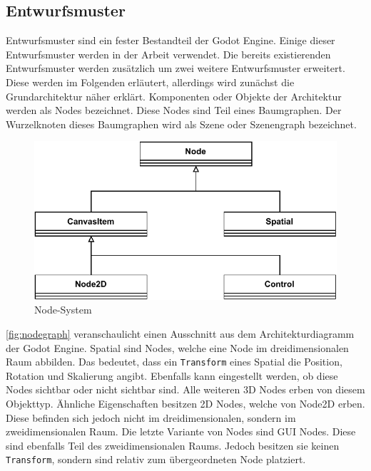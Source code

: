 \subsection{Entwurfsmuster}
Entwurfsmuster sind ein fester Bestandteil der Godot Engine.
Einige dieser Entwurfsmuster werden in der Arbeit verwendet.
Die bereits existierenden Entwurfsmuster werden zusätzlich um zwei weitere Entwurfsmuster erweitert.
Diese werden im Folgenden erläutert, allerdings wird zunächst die Grundarchitektur näher erklärt.
Komponenten oder Objekte der Architektur werden als Nodes bezeichnet.
Diese Nodes sind Teil eines Baumgraphen.
Der Wurzelknoten dieses Baumgraphen wird als Szene oder Szenengraph bezeichnet.\\

\begin{figure}[ht]
	\centering
	\includegraphics[width=0.8\columnwidth]{figures/node-graph.pdf}
	\caption{\label{fig:nodegraph} Node-System}
\end{figure}

\autoref{fig:nodegraph} veranschaulicht einen Ausschnitt aus dem Architekturdiagramm der Godot Engine\cite{godot-architecture}.
Spatial sind Nodes, welche eine Node im dreidimensionalen Raum abbilden.
Das bedeutet, dass ein \texttt{Transform} eines Spatial die Position, Rotation und Skalierung angibt.
Ebenfalls kann eingestellt werden, ob diese Nodes sichtbar oder nicht sichtbar sind.
Alle weiteren 3D Nodes erben von diesem Objekttyp.
Ähnliche Eigenschaften besitzen {2D Nodes}, welche von Node2D erben.
Diese befinden sich jedoch nicht im dreidimensionalen, sondern im zweidimensionalen Raum.
Die letzte Variante von Nodes sind \ac{GUI} Nodes.
Diese sind ebenfalls Teil des zweidimensionalen Raums.
Jedoch besitzen sie keinen \texttt{Transform}, sondern sind relativ zum übergeordneten Node platziert.\\

